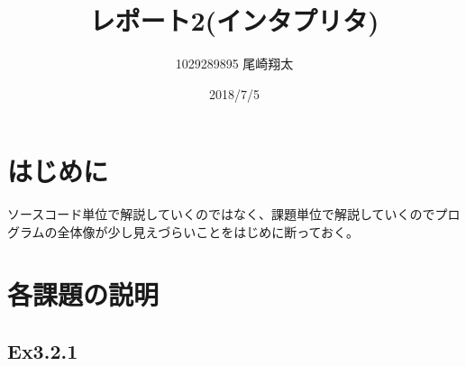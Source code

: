 \documentclass{jarticle}
\begin{document}
\title{レポート2(インタプリタ)}
\author{1029289895 尾崎翔太}
\date{2018/7/5}

\maketitle

\section{はじめに}
ソースコード単位で解説していくのではなく、課題単位で解説していくのでプログラムの全体像が少し見えづらいことをはじめに断っておく。

\section{各課題の説明}
\subsection{Ex3.2.1}
\end{document}
